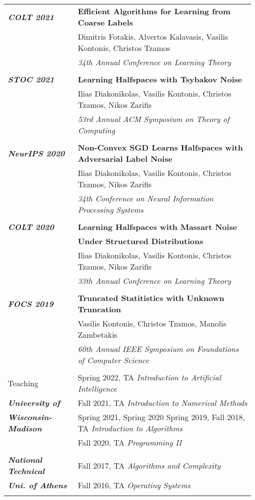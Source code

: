 \documentclass[letterpaper,11pt,oneside]{article}
\begin{document}
\begin{longtable}{@{} l l}
\emph{\textbf{COLT 2021}}
 &\textbf{Efficient Algorithms for Learning from Coarse Labels}\\
 &  Dimitris Fotakis, Alvertos Kalavasis, Vasilis Kontonis, Christos Tzamos \\
 & \emph{34th Annual Conference on Learning Theory } \\
 & \\

\emph{\textbf{STOC 2021}}
     &\textbf{Learning Halfspaces with Tsybakov Noise}\\
     & Ilias Diakonikolas, Vasilis Kontonis, Christos Tzamos, Nikos Zarifis \\
     & \emph{53rd Annual ACM Symposium on Theory of Computing } \\
     & \\

\emph{\textbf{NeurIPS 2020}}
     &\textbf{Non-Convex SGD Learns Halfspaces with Adversarial Label Noise} \\
     & Ilias Diakonikolas, Vasilis Kontonis, Christos Tzamos, Nikos Zarifis \\
     & \emph{34th Conference on Neural Information Processing Systems} \\
     & \\

\emph{\textbf{COLT 2020}}
     &\textbf{Learning Halfspaces with Massart Noise}\\
     &\textbf{Under Structured Distributions}\\
     & Ilias Diakonikolas, Vasilis Kontonis, Christos Tzamos, Nikos Zarifis \\
     & \emph{33th Annual Conference on Learning Theory} \\
     & \\

\emph{\textbf{FOCS 2019}}
     & \textbf{Truncated Statitistics with Unknown Truncation} \\
     & Vasilis Kontonis, Christos Tzamos, Manolis Zambetakis\\
     & \emph{60th Annual IEEE Symposium on Foundations of Computer Science} \\
     & \\


  \Large{Teaching}

  & Spring 2022, TA \emph{Introduction to Artificial Intelligence} \\
  \emph{\textbf{University of}}
  & Fall 2021, TA \emph{Introduction to Numerical Methods} \\
  \emph{\textbf{Wisconsin-Madison}}
  & Spring 2021, Spring 2020 Spring 2019, Fall 2018, TA \emph{Introduction to Algorithms}\\
  & Fall 2020, TA \emph{Programming II}\\
   & \\
   \emph{\textbf{National Technical }}
  & Fall 2017, TA  \emph{Algorithms and Complexity}  \\
  \emph{\textbf{Uni. of Athens} }
  & Fall 2016, TA \emph{Operating Systems}  \\
  & \\



\end{longtable}
\end{document}
